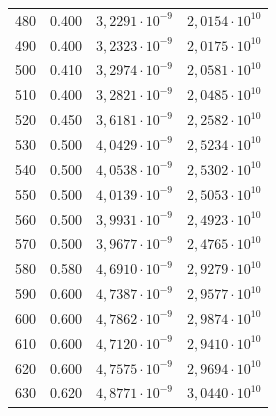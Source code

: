 \begin{table}[H]
\begin{tabular}{S[table-format=3.0] S[table-format=1.3] S  S}
      480            &         0.400        &       {$3,2291 \cdot 10^{-9}$}        &       {$2,0154 \cdot 10^{10}$}       \\
      490            &         0.400        &       {$3,2323 \cdot 10^{-9}$}        &       {$2,0175 \cdot 10^{10}$}       \\
      500            &         0.410        &       {$3,2974 \cdot 10^{-9}$}        &       {$2,0581 \cdot 10^{10}$}       \\
      510            &         0.400        &       {$3,2821 \cdot 10^{-9}$}        &       {$2,0485 \cdot 10^{10}$}       \\
      520            &         0.450        &       {$3,6181 \cdot 10^{-9}$}        &       {$2,2582 \cdot 10^{10}$}       \\
      530            &         0.500        &       {$4,0429 \cdot 10^{-9}$}        &       {$2,5234 \cdot 10^{10}$}       \\
      540            &         0.500        &       {$4,0538 \cdot 10^{-9}$}        &       {$2,5302 \cdot 10^{10}$}       \\
      550            &         0.500        &       {$4,0139 \cdot 10^{-9}$}        &       {$2,5053 \cdot 10^{10}$}       \\
      560            &         0.500        &       {$3,9931 \cdot 10^{-9}$}        &       {$2,4923 \cdot 10^{10}$}       \\
      570            &         0.500        &       {$3,9677 \cdot 10^{-9}$}        &       {$2,4765 \cdot 10^{10}$}       \\
      580            &         0.580        &       {$4,6910 \cdot 10^{-9}$}        &       {$2,9279 \cdot 10^{10}$}       \\
      590            &         0.600        &       {$4,7387 \cdot 10^{-9}$}        &       {$2,9577 \cdot 10^{10}$}       \\
      600            &         0.600        &       {$4,7862 \cdot 10^{-9}$}        &       {$2,9874 \cdot 10^{10}$}       \\
      610            &         0.600        &       {$4,7120 \cdot 10^{-9}$}        &       {$2,9410 \cdot 10^{10}$}       \\
      620            &         0.600        &       {$4,7575 \cdot 10^{-9}$}        &       {$2,9694 \cdot 10^{10}$}       \\
      630            &         0.620        &       {$4,8771 \cdot 10^{-9}$}        &       {$3,0440 \cdot 10^{10}$}       \\

\end{tabular}
\end{table}
